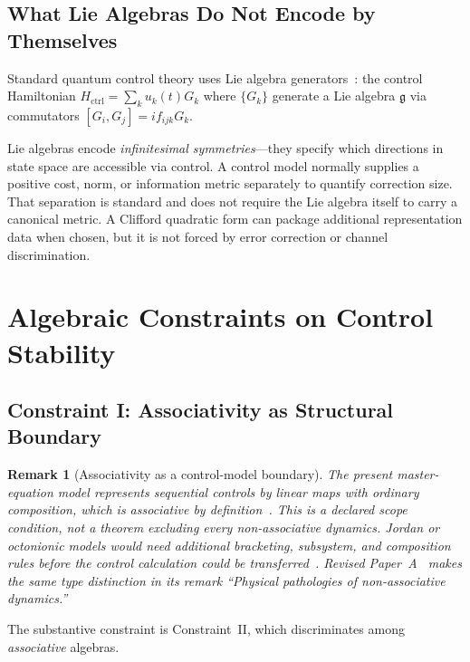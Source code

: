 \documentclass[12pt,a4paper,openany]{book}
\newtheorem{remark}[theorem]{Remark}
\begin{document}
\subsection{What Lie Algebras Do Not Encode by Themselves}

Standard quantum control theory uses Lie algebra generators~\cite{WisemanMilburn2009}: the control Hamiltonian $H_{\mathrm{ctrl}} = \sum_k u_k(t) G_k$ where $\{G_k\}$ generate a Lie algebra $\mathfrak{g}$ via commutators $[G_i, G_j] = i f_{ijk} G_k$.

Lie algebras encode \emph{infinitesimal symmetries}---they specify which directions in state space are accessible via control.  A control model normally supplies a positive cost, norm, or information metric separately to quantify correction size.  That separation is standard and does not require the Lie algebra itself to carry a canonical metric.  A Clifford quadratic form can package additional representation data when chosen, but it is not forced by error correction or channel discrimination.

\section{Algebraic Constraints on Control Stability}
\label{B-sec:stability}

\subsection{Constraint I: Associativity as Structural Boundary}
\label{B-sec:assoc}

\begin{remark}[Associativity as a control-model boundary]
\label{B-rem:assoc-boundary}
The present master-equation model represents sequential controls by linear maps with ordinary composition, which is associative by definition~\cite{Breuer2002}.  This is a declared scope condition, not a theorem excluding every non-associative dynamics.  Jordan or octonionic models would need additional bracketing, subsystem, and composition rules before the control calculation could be transferred~\cite{Schafer1966,Gunaydin1973}.  Revised Paper~A~\cite{Liu2026QRAIF_A} makes the same type distinction in its remark ``Physical pathologies of non-associative dynamics.''
\end{remark}

The substantive constraint is Constraint~II, which discriminates among \emph{associative} algebras.
\end{document}
